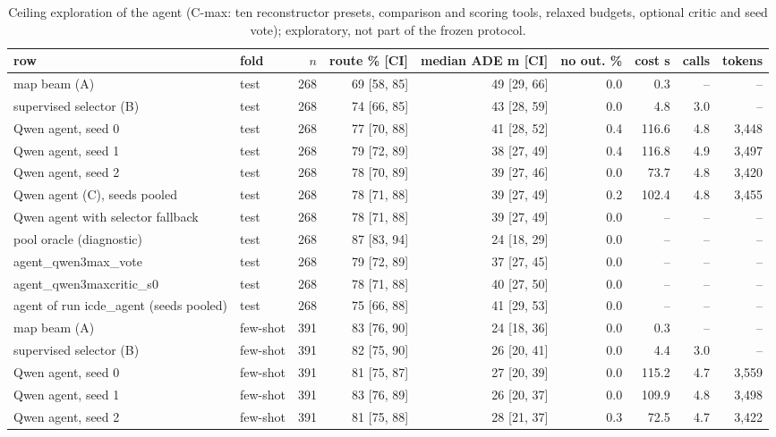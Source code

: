 \begin{table}[t]\centering\scriptsize\setlength{\tabcolsep}{3pt}
\caption{Ceiling exploration of the agent (C-max: ten reconstructor presets, comparison and scoring tools, relaxed budgets, optional critic and seed vote); exploratory, not part of the frozen protocol.}\label{tab:supp_agent_max}
\begin{tabular}{llrrrrrrr}\toprule
row & fold & $n$ & route \% [CI] & median ADE m [CI] & no out. \% & cost s & calls & tokens \\\midrule
map beam (A) & test & 268 & 69 [58, 85] & 49 [29, 66] & 0.0 & 0.3 & -- & -- \\
supervised selector (B) & test & 268 & 74 [66, 85] & 43 [28, 59] & 0.0 & 4.8 & 3.0 & -- \\
Qwen agent, seed 0 & test & 268 & 77 [70, 88] & 41 [28, 52] & 0.4 & 116.6 & 4.8 & 3{,}448 \\
Qwen agent, seed 1 & test & 268 & 79 [72, 89] & 38 [27, 49] & 0.4 & 116.8 & 4.9 & 3{,}497 \\
Qwen agent, seed 2 & test & 268 & 78 [70, 89] & 39 [27, 46] & 0.0 & 73.7 & 4.8 & 3{,}420 \\
Qwen agent (C), seeds pooled & test & 268 & 78 [71, 88] & 39 [27, 49] & 0.2 & 102.4 & 4.8 & 3{,}455 \\
Qwen agent with selector fallback & test & 268 & 78 [71, 88] & 39 [27, 49] & 0.0 & -- & -- & -- \\
pool oracle (diagnostic) & test & 268 & 87 [83, 94] & 24 [18, 29] & 0.0 & -- & -- & -- \\
agent\_qwen3max\_vote & test & 268 & 79 [72, 89] & 37 [27, 45] & 0.0 & -- & -- & -- \\
agent\_qwen3maxcritic\_s0 & test & 268 & 78 [71, 88] & 40 [27, 50] & 0.0 & -- & -- & -- \\
agent of run icde\_agent (seeds pooled) & test & 268 & 75 [66, 88] & 41 [29, 53] & 0.0 & -- & -- & -- \\
map beam (A) & few-shot & 391 & 83 [76, 90] & 24 [18, 36] & 0.0 & 0.3 & -- & -- \\
supervised selector (B) & few-shot & 391 & 82 [75, 90] & 26 [20, 41] & 0.0 & 4.4 & 3.0 & -- \\
Qwen agent, seed 0 & few-shot & 391 & 81 [75, 87] & 27 [20, 39] & 0.0 & 115.2 & 4.7 & 3{,}559 \\
Qwen agent, seed 1 & few-shot & 391 & 83 [76, 89] & 26 [20, 37] & 0.0 & 109.9 & 4.8 & 3{,}498 \\
Qwen agent, seed 2 & few-shot & 391 & 81 [75, 88] & 28 [21, 37] & 0.3 & 72.5 & 4.7 & 3{,}422 \\

\end{tabular}
\end{table}
